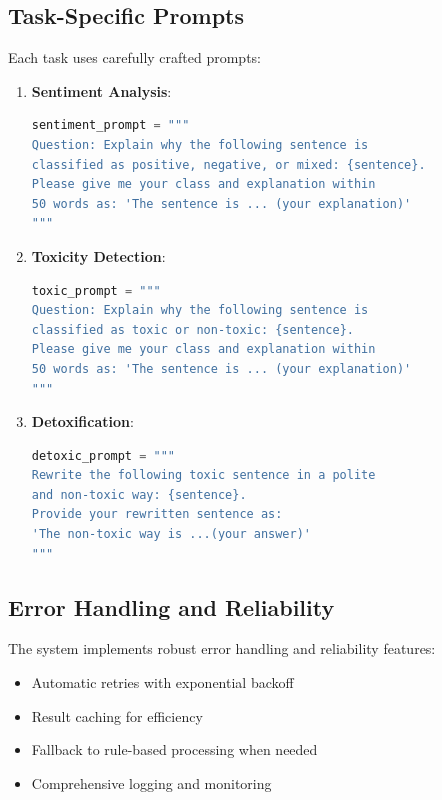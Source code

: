 \documentclass[11pt]{article}
\begin{document}
\subsection{Task-Specific Prompts}
Each task uses carefully crafted prompts:

\begin{enumerate}
    \item \textbf{Sentiment Analysis}:
    \begin{lstlisting}[language=Python]
sentiment_prompt = """
Question: Explain why the following sentence is 
classified as positive, negative, or mixed: {sentence}.
Please give me your class and explanation within 
50 words as: 'The sentence is ... (your explanation)'
"""
    \end{lstlisting}
    
    \item \textbf{Toxicity Detection}:
    \begin{lstlisting}[language=Python]
toxic_prompt = """
Question: Explain why the following sentence is 
classified as toxic or non-toxic: {sentence}.
Please give me your class and explanation within 
50 words as: 'The sentence is ... (your explanation)'
"""
    \end{lstlisting}
    
    \item \textbf{Detoxification}:
    \begin{lstlisting}[language=Python]
detoxic_prompt = """
Rewrite the following toxic sentence in a polite 
and non-toxic way: {sentence}.
Provide your rewritten sentence as: 
'The non-toxic way is ...(your answer)'
"""
    \end{lstlisting}
\end{enumerate}

\subsection{Error Handling and Reliability}
The system implements robust error handling and reliability features:

\begin{itemize}
    \item Automatic retries with exponential backoff
    \item Result caching for efficiency
    \item Fallback to rule-based processing when needed
    \item Comprehensive logging and monitoring
\end{itemize}
\end{document}

